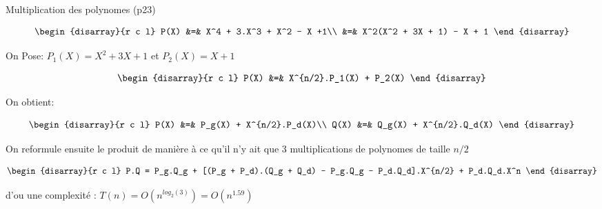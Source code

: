 \begin{exercice}{Multiplication des polynomes (p23)}

\[
\begin{disarray}{r c l}
P(X) &=& X^4 + 3.X^3 + X^2 - X +1\\
&=& X^2(X^2 + 3X + 1) - X + 1
\end{disarray}
\]

On Pose: $P_1(X) = X^2 + 3X +1$ et $P_2(X) = X + 1$

\[
\begin{disarray}{r c l}
P(X) &=& X^{n/2}.P_1(X) + P_2(X)
\end{disarray}
\]

On obtient:

\[
\begin{disarray}{r c l}
P(X) &=& P_g(X) + X^{n/2}.P_d(X)\\
Q(X) &=& Q_g(X) + X^{n/2}.Q_d(X)
\end{disarray}
\]

On reformule ensuite le produit de manière à ce qu'il n'y ait que 3 multiplications de polynomes de taille $n/2$

\[
\begin{disarray}{r c l}
P.Q = P_g.Q_g + [(P_g + P_d).(Q_g + Q_d) - P_g.Q_g - P_d.Q_d].X^{n/2} + P_d.Q_d.X^n
\end{disarray}
\]

d'ou une complexité : $T(n) = O(n^{log_2(3)}) = O(n^{1.59})$

\end{exercice}


